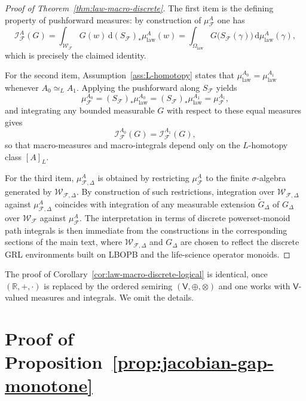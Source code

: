 \documentclass[11pt]{book}
\theoremstyle{plain}
\theoremstyle{definition}
\theoremstyle{remark}
\begin{document}
\begin{proof}[Proof of Theorem~\ref{thm:law-macro-discrete}]
The first item is the defining property of pushforward measures:
by construction of $\mu_{\mathcal{F}}^A$ one has
\[
  \mathcal{I}_{\mathcal{F}}^A(G)
  =
  \int_{\mathcal{W}_{\mathcal{F}}} G(w)\,
    \mathrm{d}(S_{\mathcal{F}})_*\mu_{\mathrm{law}}^A(w)
  =
  \int_{\Omega_{\mathrm{law}}}
    G\bigl(S_{\mathcal{F}}(\gamma)\bigr)\,
    \mathrm{d}\mu_{\mathrm{law}}^A(\gamma),
\]
which is precisely the claimed identity.

For the second item, Assumption~\ref{ass:L-homotopy} states that
$\mu_{\mathrm{law}}^{A_0}=\mu_{\mathrm{law}}^{A_1}$ whenever
$A_0\simeq_L A_1$.
Applying the pushforward along $S_{\mathcal{F}}$ yields
\[
  \mu_{\mathcal{F}}^{A_0}
  = (S_{\mathcal{F}})_*\mu_{\mathrm{law}}^{A_0}
  = (S_{\mathcal{F}})_*\mu_{\mathrm{law}}^{A_1}
  = \mu_{\mathcal{F}}^{A_1},
\]
and integrating any bounded measurable $G$ with respect to these equal
measures gives
\[
  \mathcal{I}_{\mathcal{F}}^{A_0}(G)
  = \mathcal{I}_{\mathcal{F}}^{A_1}(G),
\]
so that macro-measures and macro-integrals depend only on the
$L$-homotopy class $[A]_L$.

For the third item, $\mu_{\mathcal{F},\Delta}^A$ is obtained by
restricting $\mu_{\mathcal{F}}^A$ to the finite $\sigma$-algebra
generated by $\mathcal{W}_{\mathcal{F},\Delta}$.
By construction of such restrictions, integration over
$\mathcal{W}_{\mathcal{F},\Delta}$ against $\mu_{\mathcal{F},\Delta}^A$
coincides with integration of any measurable extension
$\widetilde{G}_\Delta$ of $G_\Delta$ over $\mathcal{W}_{\mathcal{F}}$
against $\mu_{\mathcal{F}}^A$.
The interpretation in terms of discrete powerset-monoid path integrals
is then immediate from the constructions in the corresponding sections
of the main text, where $\mathcal{W}_{\mathcal{F},\Delta}$ and
$G_\Delta$ are chosen to reflect the discrete GRL environments built
on LBOPB and the life-science operator monoids.
\end{proof}

The proof of Corollary~\ref{cor:law-macro-discrete-logical} is
identical, once $(\mathbb{R},+,\cdot)$ is replaced by the ordered
semiring $(\mathsf{V},\oplus,\otimes)$ and one works with
$\mathsf{V}$-valued measures and integrals. We omit the details.

\section{Proof of Proposition~\ref{prop:jacobian-gap-monotone}}
\end{document}
